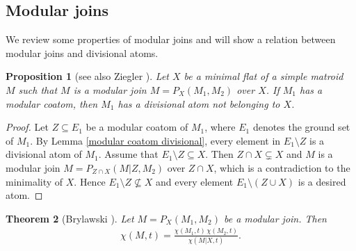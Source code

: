 \documentclass[pdftex]{sigma}
\numberwithin{equation}{section}
\newtheorem{Theorem}{Theorem}[section]
\newtheorem{Proposition}[Theorem]{Proposition}
 { \theoremstyle{definition}
\newtheorem{Definition}[Theorem]{Definition}
\newtheorem{Example}[Theorem]{Example}
\newtheorem{Remark}[Theorem]{Remark}
\newtheorem{Question}[Theorem]{Question} }
\begin{document}
\subsection{Modular joins}

We review some properties of modular joins and will show a relation between modular joins and divisional atoms.

\begin{Proposition}[see also Ziegler {\cite[Lemma 3.10]{ziegler1991binary-potams}}]\label{Ziegler case of modular coatom}
Let $ X $ be a minimal flat of a simple matroid $ M $ such that $ M $ is a modular join $ M = P_{X}(M_{1}, M_{2}) $ over $ X $.
If $ M_{1} $ has a modular coatom, then $ M_{1} $ has a divisional atom not belonging to $ X $.
\end{Proposition}
\begin{proof}
Let $ Z \subseteq E_{1} $ be a modular coatom of $ M_{1} $, where $ E_{1} $ denotes the ground set of $ M_{1} $.
By Lemma \ref{modular coatom divisional}, every element in $ E_{1}\setminus Z $ is a divisional atom of $ M_{1} $.
Assume that $ E_{1}\setminus Z \subseteq X $.
Then $ Z \cap X \subsetneq X $ and $ M $ is a modular join $ M = P_{Z \cap X}(M|Z, M_{2}) $ over $ Z \cap X $, which is a contradiction to the minimality of $ X $.
Hence $ E_{1}\setminus Z \not\subseteq X $ and every element $ E_{1}\setminus(Z \cup X) $ is a desired atom.
\end{proof}

\begin{Theorem}[Brylawski {\cite[Theorem 7.8]{brylawski1975modular-totams}}]\label{Brylawski decomposition}
Let $ M = P_{X}(M_{1}, M_{2}) $ be a modular join.
Then
\begin{align*}
\chi(M,t) = \frac{\chi(M_{1},t) \, \chi(M_{2},t)}{\chi(M|X,t)}.
\end{align*}
\end{Theorem}
\end{document}
